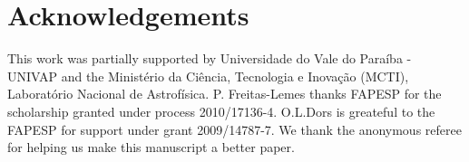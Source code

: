 \documentclass[useAMS,usenatbib]{mn2e}
\begin{document}
\section{Acknowledgements}

This work was partially supported by Universidade do Vale do Para\'{i}ba -
UNIVAP and the Minist\'erio da Ci\^{e}ncia, Tecnologia e Inova\c{c}\~{a}o
(MCTI), Laborat\'{o}rio Nacional de Astrof\'{i}sica. P. Freitas-Lemes thanks
FAPESP for the scholarship granted under process 2010/17136-4. O.L.Dors is
greateful to the FAPESP for support under grant 2009/14787-7.
  We thank the anonymous referee for helping us make this manuscript a better paper.






\end{document}
